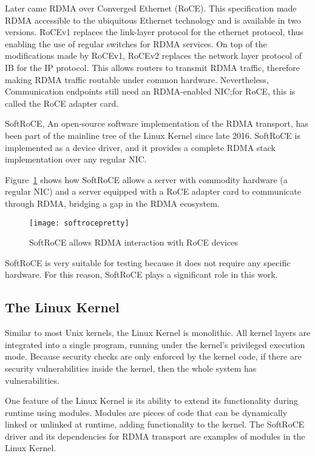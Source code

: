 Later came RDMA over Converged Ethernet (RoCE). This specification
made RDMA accessible to the ubiquitous Ethernet technology and is available
in two versions. RoCEv1 replaces the link-layer protocol for the ethernet protocol,
thus enabling the use of regular switches for RDMA services. On top of the modifications
made by RoCEv1, RoCEv2 replaces the network layer protocol of IB for the IP protocol. This
allows routers to transmit RDMA traffic, therefore making RDMA traffic routable under
common hardware. Nevertheless, Communication endpoints still need an RDMA-enabled NIC;\@ for RoCE, this
is called the RoCE adapter card.

SoftRoCE, An open-source software implementation of the RDMA transport, has been part of the mainline tree of
the Linux Kernel since late 2016. SoftRoCE is implemented as a device driver, and it provides a complete RDMA
stack implementation over any regular NIC\cite{softroce}.

Figure~\ref{fig:softroce} shows how SoftRoCE allows a server with commodity hardware (a regular NIC)
and a server equipped with a RoCE adapter card to communicate through RDMA, bridging a gap in the RDMA ecosystem.

\begin{figure}[h!]
  \centering
  \texttt{[image: softrocepretty]}
  \caption[SoftRoCE]{SoftRoCE allows RDMA interaction with RoCE devices\footnotemark}\label{fig:softroce}
\end{figure}


SoftRoCE is very suitable for testing because it does not require any specific
hardware. For this reason, SoftRoCE plays a significant role in this work.

\subsection{The Linux Kernel}

Similar to most Unix kernels, the Linux Kernel is monolithic. All kernel layers
are integrated into a single program, running under the kernel's privileged execution
mode. Because security checks are only enforced by the kernel code,
if there are security vulnerabilities inside the kernel, then the whole system has vulnerabilities\cite{korbethLinuxDeviceDrivers2005}.

One feature of the Linux Kernel is its ability to extend its functionality during runtime using
modules. Modules are pieces of code that can be dynamically linked or unlinked at runtime,
adding functionality to the kernel\cite{korbethLinuxDeviceDrivers2005}. The SoftRoCE driver
and its dependencies for RDMA transport are examples of modules in the Linux Kernel.

